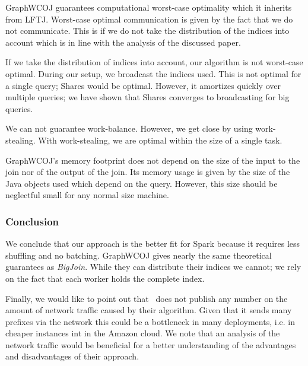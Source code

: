 GraphWCOJ guarantees computational worst-case optimality which it inherits from \textsc{LFTJ}.
Worst-case optimal communication is given by the fact that we do not communicate.
This is if we do not take the distribution of the indices into account which is in line with the analysis of the discussed paper.

If we take the distribution of indices into account, our algorithm is not worst-case optimal.
During our setup, we broadcast the indices used.
This is not optimal for a single query;
Shares would be optimal.
However, it amortizes quickly over multiple queries;
we have shown that Shares converges to broadcasting for big queries.

We can not guarantee work-balance.
However, we get close by using work-stealing.
With work-stealing, we are optimal within the size of a single task.

GraphWCOJ's memory footprint does not depend on the size of the input to the join nor of the output of the join.
Its memory usage is given by the size of the Java objects used which depend on the query.
However, this size should be neglectful small for any normal size machine.

\subsubsection{Conclusion}
We conclude that our approach is the better fit for Spark because it requires less shuffling and no batching.
GraphWCOJ gives nearly the same theoretical guarantees as \textit{BigJoin}.
While they can distribute their indices we cannot;
we rely on the fact that each worker holds the complete index.

Finally, we would like to point out that~\cite{ammar2018distributed} does not publish any number on the amount
of network traffic caused by their algorithm.
Given that it sends many prefixes via the network this could be a bottleneck in many deployments, i.e. in cheaper instances
int in the Amazon cloud.
We note that an analysis of the network traffic would be beneficial for a better understanding of the advantages and disadvantages
of their approach.



